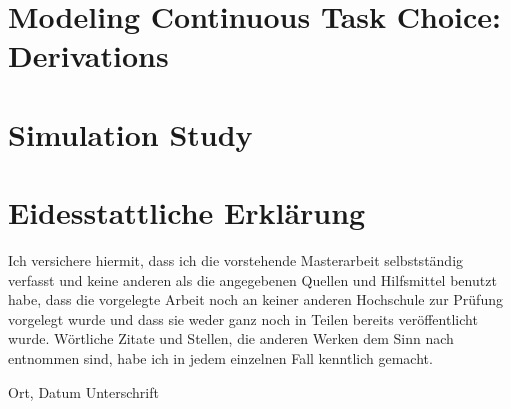\documentclass[12pt, a4paper, oneside, full]{article}
\begin{document}
\newpage
\printbibliography



\newpage
{} %
\begin{appendix}

\section{Modeling Continuous Task Choice: Derivations}





\section{Simulation Study}



\end{appendix}

\newpage
\section{Eidesstattliche Erklärung}
Ich versichere hiermit, dass ich die vorstehende Masterarbeit selbstständig verfasst und keine anderen als die angegebenen Quellen und Hilfsmittel benutzt habe, dass die vorgelegte Arbeit noch an keiner anderen Hochschule zur Prüfung vorgelegt wurde und dass sie weder ganz noch in Teilen bereits veröffentlicht  wurde. Wörtliche Zitate und Stellen, die anderen Werken dem Sinn nach entnommen sind, habe ich in jedem einzelnen Fall kenntlich gemacht.

\vspace{4cm}

\hspace{2cm} Ort, Datum \hfill Unterschrift \hspace{2cm}
\end{document}
